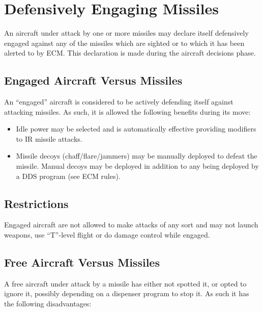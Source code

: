 \section{Defensively Engaging Missiles}
\label{rule:engaging-missiles}

An aircraft under attack by one or more missiles may declare itself defensively engaged against any of the missiles which are sighted or to which it has been alerted to by ECM. This declaration is made during the aircraft decisions phase.

\subsection{Engaged Aircraft Versus Missiles} An “engaged” aircraft is considered to be actively defending itself against attacking missiles. As such, it is allowed the following benefits during its move:

\begin{itemize}

    \item Idle power may be selected and is automatically effective providing modifiers to IR missile attacks.

    \item Missile decoys (chaff/flare/jammers) may be manually deployed to defeat the missile. Manual decoys may be deployed in addition to any being deployed by a DDS program (see ECM rules).


\end{itemize}

\subsection{Restrictions} Engaged aircraft are not allowed to make attacks of any sort and may not launch weapons, use “T”-level flight or do damage control while engaged.

\subsection{Free Aircraft Versus Missiles} A free aircraft under attack by a missile has either not spotted it, or opted to ignore it, possibly depending on a dispenser program to stop it. As such it has the following disadvantages:

